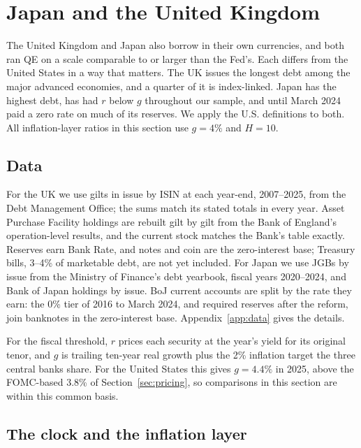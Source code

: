 \section{Japan and the United Kingdom}\label{sec:international}

The United Kingdom and Japan also borrow in their own currencies, and both ran QE on a scale comparable to or larger than the Fed's. Each differs from the United States in a way that matters. The UK issues the longest debt among the major advanced economies, and a quarter of it is index-linked. Japan has the highest debt, has had $r$ below $g$ throughout our sample, and until March 2024 paid a zero rate on much of its reserves. We apply the U.S. definitions to both. All inflation-layer ratios in this section use $g=4\%$ and $H=10$.

\subsection{Data}\label{sec:intldata}

For the UK we use gilts in issue by ISIN at each year-end, 2007--2025, from the Debt Management Office; the sums match its stated totals in every year. Asset Purchase Facility holdings are rebuilt gilt by gilt from the Bank of England's operation-level results, and the current stock matches the Bank's table exactly. Reserves earn Bank Rate, and notes and coin are the zero-interest base; Treasury bills, 3--4\% of marketable debt, are not yet included. For Japan we use JGBs by issue from the Ministry of Finance's debt yearbook, fiscal years 2020--2024, and Bank of Japan holdings by issue. BoJ current accounts are split by the rate they earn: the 0\% tier of 2016 to March 2024, and required reserves after the reform, join banknotes in the zero-interest base. Appendix~\ref{app:data} gives the details.

For the fiscal threshold, $r$ prices each security at the year's yield for its original tenor, and $g$ is trailing ten-year real growth plus the 2\% inflation target the three central banks share. For the United States this gives $g=4.4\%$ in 2025, above the FOMC-based 3.8\% of Section~\ref{sec:pricing}, so comparisons in this section are within this common basis.

\subsection{The clock and the inflation layer}\label{sec:intlclock}

